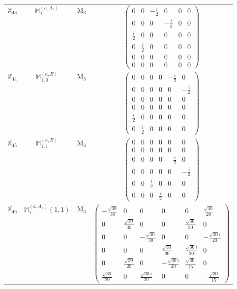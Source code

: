 \documentclass[fleqn,10pt,landscape]{article}
\begin{document}
\begin{itemize}
\begin{center}
\begin{longtable}{c|c|c|c}
$ \mathbb{X}_{43} $ & $\mathbb{M}_{1}^{(a,A_{2})}$ & M$_{3}$ & $\begin{pmatrix} 0 & 0 & - \frac{i}{2} & 0 & 0 & 0 \\ 0 & 0 & 0 & - \frac{i}{2} & 0 & 0 \\ \frac{i}{2} & 0 & 0 & 0 & 0 & 0 \\ 0 & \frac{i}{2} & 0 & 0 & 0 & 0 \\ 0 & 0 & 0 & 0 & 0 & 0 \\ 0 & 0 & 0 & 0 & 0 & 0 \end{pmatrix}$ \\
$ \mathbb{X}_{44} $ & $\mathbb{M}_{1,0}^{(a,E)}$ & M$_{3}$ & $\begin{pmatrix} 0 & 0 & 0 & 0 & - \frac{i}{2} & 0 \\ 0 & 0 & 0 & 0 & 0 & - \frac{i}{2} \\ 0 & 0 & 0 & 0 & 0 & 0 \\ 0 & 0 & 0 & 0 & 0 & 0 \\ \frac{i}{2} & 0 & 0 & 0 & 0 & 0 \\ 0 & \frac{i}{2} & 0 & 0 & 0 & 0 \end{pmatrix}$ \\
$ \mathbb{X}_{45} $ & $\mathbb{M}_{1,1}^{(a,E)}$ & M$_{3}$ & $\begin{pmatrix} 0 & 0 & 0 & 0 & 0 & 0 \\ 0 & 0 & 0 & 0 & 0 & 0 \\ 0 & 0 & 0 & 0 & - \frac{i}{2} & 0 \\ 0 & 0 & 0 & 0 & 0 & - \frac{i}{2} \\ 0 & 0 & \frac{i}{2} & 0 & 0 & 0 \\ 0 & 0 & 0 & \frac{i}{2} & 0 & 0 \end{pmatrix}$ \\
$ \mathbb{X}_{46} $ & $\mathbb{M}_{1}^{(a,A_{2})}(1,1)$ & M$_{3}$ & $\begin{pmatrix} - \frac{\sqrt{30}}{30} & 0 & 0 & 0 & 0 & \frac{\sqrt{30}}{20} \\ 0 & \frac{\sqrt{30}}{30} & 0 & 0 & \frac{\sqrt{30}}{20} & 0 \\ 0 & 0 & - \frac{\sqrt{30}}{30} & 0 & 0 & - \frac{\sqrt{30} i}{20} \\ 0 & 0 & 0 & \frac{\sqrt{30}}{30} & \frac{\sqrt{30} i}{20} & 0 \\ 0 & \frac{\sqrt{30}}{20} & 0 & - \frac{\sqrt{30} i}{20} & \frac{\sqrt{30}}{15} & 0 \\ \frac{\sqrt{30}}{20} & 0 & \frac{\sqrt{30} i}{20} & 0 & 0 & - \frac{\sqrt{30}}{15} \end{pmatrix}$ \\

\end{longtable}
\end{center}
\end{itemize}
\end{document}
